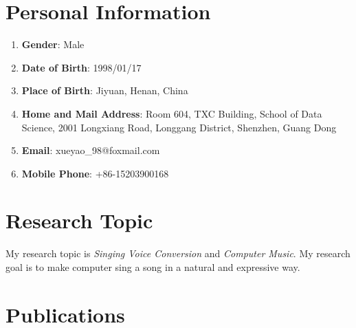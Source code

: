 \documentclass{resume}
\begin{document}




\section{Personal Information}

\begin{enumerate}
  \item \textbf{Gender}: Male
  \item \textbf{Date of Birth}: 1998/01/17
  \item \textbf{Place of Birth}: Jiyuan, Henan, China
  \item \textbf{Home and Mail Address}: Room 604, TXC Building, School of Data Science, 2001 Longxiang Road, Longgang District, Shenzhen, Guang Dong
  \item \textbf{Email}: xueyao\_98@foxmail.com
  \item \textbf{Mobile Phone}: +86-15203900168
\end{enumerate}

\section{Research Topic}

My research topic is \textit{Singing Voice Conversion} and \textit{Computer Music}. My research goal is to make computer sing a song in a natural and expressive way.

\section{Publications}
\end{document}
